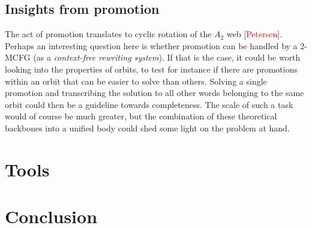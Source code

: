 \documentclass[nonatbib,numbers,10pt]{sigplanconf}
\newcommand\todo[1]{\textcolor{red}{#1}}
\begin{document}
\subsection{Insights from promotion}
The act of promotion translates to cyclic rotation of the $A_2$ web [\todo{Petersen}]. Perhaps an interesting question here is whether promotion can be handled by a 2-MCFG (as a \textit{context-free rewriting system}). If that is the case, it could be worth looking into the properties of orbits, to test for instance if there are promotions within an orbit that can be easier to solve than others. Solving a single promotion and transcribing the solution to all other words belonging to the same orbit could then be a guideline towards completeness. The scale of such a task would of course be much greater, but the combination of these theoretical backbones into a unified body could shed some light on the problem at hand.

\section{Tools}
\section{Conclusion}
\end{document}
